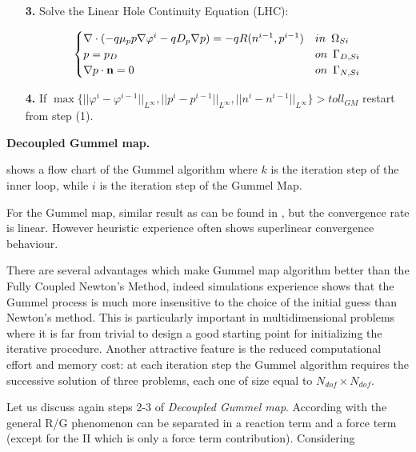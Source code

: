 {\begin{itemize}
\item[\bf 3.] Solve the Linear Hole Continuity Equation (LHC):

\vspace{-0.5cm}

\begin{equation}
\label{eq: LHC system}
\begin{cases}
\nabla \cdot (- q\mu_p p \nabla \varphi^i - qD_p \nabla p ) =  -qR(n^{i-1},p^{i-1}) & in \psp{3} \Omega_{Si}
\\
 p = p_D & on \psp{3} \Gamma_{D,Si}
 \\
 \nabla p \cdot \vect{n} = 0 & on \psp{3} \Gamma_{N,Si}
\end{cases}
\end{equation}

\item[\bf 4.] If $\max\{||\varphi^i-\varphi^{i-1}||_{L^{\infty}},||p^i-p^{i-1}||_{L^{\infty}},||n^i-n^{i-1}||_{L^{\infty}}\}>toll_{GM}$ restart from step (1).


\end{itemize}

}{\textbf{Decoupled Gummel map.}}

  shows a flow chart of the Gummel algorithm where $k$ is the iteration step of the inner loop, while $i$ is the iteration step of the Gummel Map.
 
For the Gummel map, similar result as   can be found in \cite{Jerome:AnalyCharTran}, but the convergence rate is linear. However heuristic experience often shows superlinear convergence behaviour.

There are several advantages which make Gummel map algorithm better than the Fully Coupled Newton's Method, indeed simulations experience shows that the Gummel process is much more insensitive to the choice of the initial guess than Newton's method. This is particularly important in multidimensional problems where it is far from trivial to design a good starting point for initializing the iterative procedure. Another attractive feature is the reduced computational effort and memory cost: at each iteration step the Gummel algorithm requires the successive solution of three problems, each one of size equal to $N_{dof}\times N_{dof}$.


Let us discuss again steps 2-3 of \textit{Decoupled Gummel map}. According with  the general R/G phenomenon can be separated in a reaction term and a force term (except for the II which is only a force term contribution). 
Considering

